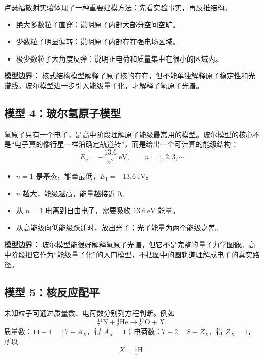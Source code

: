 卢瑟福散射实验体现了一种重要建模方法：先看实验事实，再反推结构。
\begin{itemize}
  \item 绝大多数粒子直穿：说明原子内部大部分空间空旷。
  \item 少数粒子明显偏转：说明原子内部存在强电场区域。
  \item 极少数粒子大角度反弹：说明正电荷和质量集中在很小的区域内。
\end{itemize}

\textbf{模型边界：} 核式结构模型解释了原子核的存在，但不能单独解释原子稳定性和光谱线。玻尔模型进一步引入能级量子化，才解释了氢原子光谱。

\subsection*{模型 4：玻尔氢原子模型}

氢原子只有一个电子，是高中阶段理解原子能级最常用的模型。玻尔模型的核心不是“电子真的像行星一样沿确定轨道转”，而是给出一个可计算的能级结构：
\[
E_n=-\frac{13.6}{n^2}\ \mathrm{eV},\qquad n=1,2,3,\cdots
\]

\begin{center}


\label{fig:bohr-hydrogen-levels}
\end{center}

\begin{itemize}
  \item $n=1$ 是基态，能量最低，$E_1=-13.6\ \mathrm{eV}$。
  \item $n$ 越大，能级越高，能量越接近 $0$。
  \item 从 $n=1$ 电离到自由电子，需要吸收 $13.6\ \mathrm{eV}$ 能量。
  \item 从高能级向低能级跃迁时，放出光子；光子能量为两个能级之差。
\end{itemize}

\textbf{模型边界：} 玻尔模型能很好解释氢原子光谱，但它不是完整的量子力学图像。高中阶段把它作为“能级量子化”的入门模型，不把图中的圆轨道理解成电子的真实路径。

\subsection*{模型 5：核反应配平}

未知粒子可通过质量数、电荷数分别列方程判断。例如
\[
{}^{14}_{7}\mathrm{N}+{}^4_2\mathrm{He}\rightarrow{}^{17}_{8}\mathrm{O}+X.
\]
质量数：$14+4=17+A_X$，得 $A_X=1$；电荷数：$7+2=8+Z_X$，得 $Z_X=1$，所以
\[
X={}^1_1\mathrm{H}.
\]

